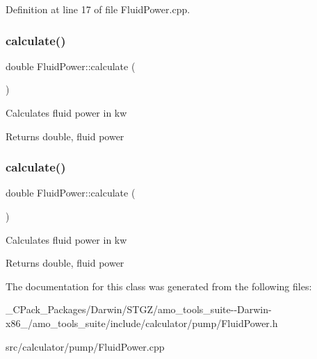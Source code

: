 Definition at line 17 of file Fluid\+Power.\+cpp.

\mbox{\label{class_fluid_power_a2691f6efdbd5e71aa91e087c6b1c197b}} 
\subsubsection{\texorpdfstring{calculate()}{calculate()}\hspace{0.1cm}{\footnotesize\ttfamily [2/3]}}
{\footnotesize\ttfamily double Fluid\+Power\+::calculate (\begin{DoxyParamCaption}{ }\end{DoxyParamCaption})}

Calculates fluid power in kw \begin{DoxyReturn}{Returns}
double, fluid power 
\end{DoxyReturn}
\mbox{\label{class_fluid_power_a2691f6efdbd5e71aa91e087c6b1c197b}} 
\subsubsection{\texorpdfstring{calculate()}{calculate()}\hspace{0.1cm}{\footnotesize\ttfamily [3/3]}}
{\footnotesize\ttfamily double Fluid\+Power\+::calculate (\begin{DoxyParamCaption}{ }\end{DoxyParamCaption})}

Calculates fluid power in kw \begin{DoxyReturn}{Returns}
double, fluid power 
\end{DoxyReturn}


The documentation for this class was generated from the following files\+:\begin{DoxyCompactItemize}
\item 
\+\_\+\+C\+Pack\+\_\+\+Packages/\+Darwin/\+S\+T\+G\+Z/amo\+\_\+tools\+\_\+suite-\/-\/\+Darwin-\/x86\+\_/amo\+\_\+tools\+\_\+suite/include/calculator/pump/Fluid\+Power.\+h\item 
src/calculator/pump/Fluid\+Power.\+cpp\end{DoxyCompactItemize}
